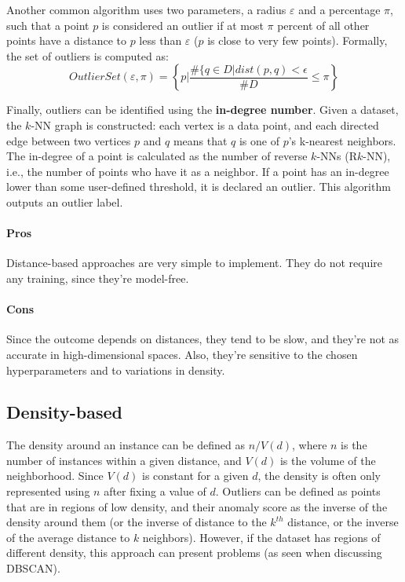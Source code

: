 Another common algorithm uses two parameters, a radius $\varepsilon$ and a percentage $\pi$, such that a point $p$ is considered an outlier if at most $\pi$ percent of all other points have a distance to $p$ less than $\varepsilon$ ($p$ is close to very few points). Formally, the set of outliers is computed as:
\begin{equation*}
    \textit{OutlierSet}(\varepsilon, \pi) = \left\{ p | \dfrac{\#\{q \in D | \textit{dist}(p,q) < \epsilon}{\# D} \leq \pi \right\}
\end{equation*}

Finally, outliers can be identified using the \textbf{in-degree number}. Given a dataset, the $k$-NN graph is constructed: each vertex is a data point, and each directed edge between two vertices $p$ and $q$ means that $q$ is one of $p$'s k-nearest neighbors. The in-degree of a point is calculated as the number of reverse $k$-NNs (R$k$-NN), i.e., the number of points who have it as a neighbor. If a point has an in-degree lower than some user-defined threshold, it is declared an outlier. This algorithm outputs an outlier label.

\paragraph{Pros} Distance-based approaches are very simple to implement. They do not require any training, since they're model-free.

\paragraph{Cons} Since the outcome depends on distances, they tend to be slow, and they're not as accurate in high-dimensional spaces. Also, they're sensitive to the chosen hyperparameters and to variations in density.

\subsection{Density-based}

The density around an instance can be defined as $n/V(d)$, where $n$ is the number of instances within a given distance, and $V(d)$ is the volume of the neighborhood. Since $V(d)$ is constant for a given $d$, the density is often only represented using $n$ after fixing a value of $d$. Outliers can be defined as points that are in regions of low density, and their anomaly score as the inverse of the density around them (or the inverse of distance to the $k^{th}$ distance, or the inverse of the average distance to $k$ neighbors). However, if the dataset has regions of different density, this approach can present problems (as seen when discussing DBSCAN).

